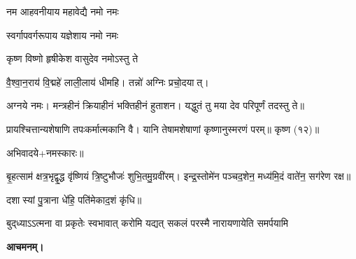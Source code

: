 {नम आहवनीयाय महावेद्यै नमो नमः}

{स्वर्गापवर्गरूपाय यज्ञेशाय नमो नमः}

{कृष्ण विष्णो हृषीकेश वासुदेव नमोऽस्तु ते}

वै॒श्वा॒न॒राय॑ वि॒द्महे॑ लाली॒लाय॑ धीमहि। 
तन्नो॑ अग्निः प्रचो॒दयात्। 

अग्नये नमः। मन्त्रहीनं क्रियाहीनं भक्तिहीनं हुताशन।
यद्धुतं तु मया देव परिपूर्णं तदस्तु ते॥

प्रायश्चित्तान्यशेषाणि तपःकर्मात्मकानि वै।
यानि तेषामशेषाणां कृष्णानुस्मरणं परम्॥ कृष्ण (१२)॥

अभिवादये+नमस्कारः॥

बृ॒हत्साम॑ क्षत्र॒भृद्वृ॒द्ध वृ॑ष्णियं त्रि॒ष्टुभौजः॑ शुभि॒तमु॒ग्रवी॑रम्।
इन्द्र॒स्तोमे॑न पञ्चद॒शेन॒ मध्य॑मि॒दं वाते॑न॒ सग॑रेण रक्ष॥

दशास्यां पु॒त्राना धे॑हि॒ पति॑मेकाद॒शं कृ॑धि॥

{बुद्‌ध्याऽऽत्मना वा प्रकृतेः स्वभावात्}
{करोमि यद्यत् सकलं परस्मै}
{नारायणायेति समर्पयामि}

\textbf{आचमनम्।}
